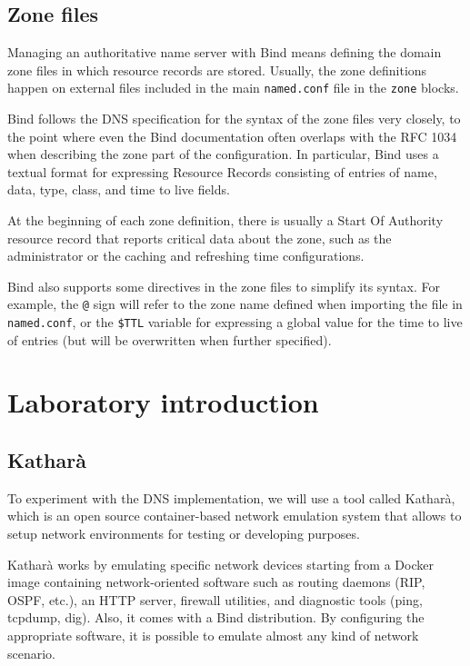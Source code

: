 \documentclass[11pt,a4paper]{article}
\begin{document}
\subsection{Zone files}

Managing an authoritative name server with Bind means defining the domain zone files in
which resource records are stored. Usually, the zone definitions happen on external files included in the main \texttt{named.conf} file in the \texttt{zone} blocks.

\noindent
Bind follows the DNS specification for the syntax of the zone files very closely, to the point
where even the Bind documentation often overlaps with the RFC 1034 when describing the zone
part of the configuration. In particular, Bind uses a textual format for expressing Resource Records consisting of entries of name, data, type, class, and time to live fields.

\noindent
At the beginning of each zone definition, there is usually a Start Of Authority resource record
that reports critical data about the zone, such as the administrator or the caching and refreshing
time configurations.

\noindent
Bind also supports some directives in the zone files to simplify its syntax. For example, the \texttt{@} sign will refer to the zone name defined when importing the file in \texttt{named.conf}, or the \texttt{\$TTL} variable for expressing a global value for the time to live of entries (but will be overwritten when further specified).

\section{Laboratory introduction}

\subsection{Katharà}
To experiment with the DNS implementation, we will use a tool called Katharà, which is an open
source container-based network emulation system that allows to setup network environments
for testing or developing purposes.

\noindent
Katharà works by emulating specific network devices starting from a Docker image containing network-oriented software such as routing daemons (RIP, OSPF, etc.), an HTTP server, firewall
utilities, and diagnostic tools (ping, tcpdump, dig). Also, it comes with a Bind distribution.
By configuring the appropriate software, it is possible to emulate almost any kind of network
scenario.
\end{document}

